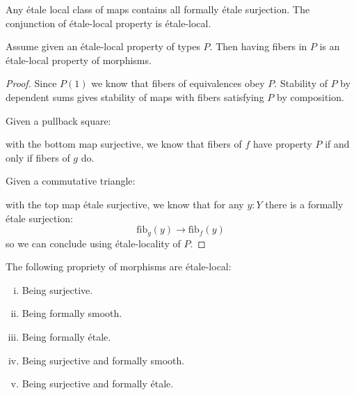 Any étale local class of maps contains all formally étale surjection. The conjunction of étale-local property is étale-local.

\begin{lemma}\label{etale-local-morphisms-from-types}
Assume given an étale-local property of types $P$. Then having fibers in $P$ is an étale-local property of morphisms. 
\end{lemma}

\begin{proof}
Since $P(1)$ we know that fibers of equivalences obey $P$. Stability of $P$ by dependent sums gives stability of maps with fibers satisfying $P$ by composition.

Given a pullback square:
  \begin{center}
  \end{center}
  with the bottom map surjective, we know that fibers of $f$ have property $P$ if and only if fibers of $g$ do.
  
  Given a commutative triangle:
    \begin{center}
  \end{center}
  with the top map étale surjective, we know that for any $y:Y$ there is a formally étale surjection:
  \[\mathrm{fib}_g(y) \to \mathrm{fib}_f(y)\]
  so we can conclude using étale-locality of $P$.
\end{proof}

\begin{lemma}\label{etale-local-class-maps}
The following propriety of morphisms are étale-local:
\begin{enumerate}[(i)]
\item Being surjective.
\item Being formally smooth.
\item Being formally étale.
\item Being surjective and formally smooth.
\item Being surjective and formally étale.
\end{enumerate}
\end{lemma}

